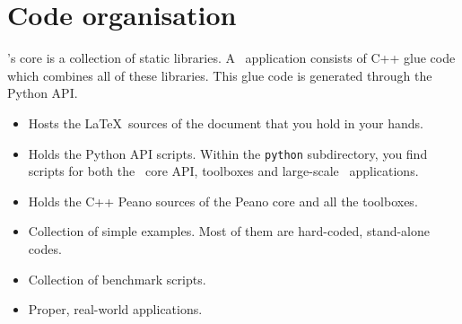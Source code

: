 \section*{Code organisation}

\Peano's core is a collection of static libraries. 
A \Peano\ application consists of C++ glue code which combines all of these
libraries.
This glue code is generated through the Python API.


\begin{itemize}
  \item[documentation] Hosts the \LaTeX\ sources of the document that you hold
  in your hands.
  \item[python] Holds the Python API scripts. Within the \texttt{python}
  subdirectory, you find scripts for both the \Peano\ core API, toolboxes and
  large-scale \Peano\ applications.
  \item[src] Holds the C++ Peano sources of the Peano core and all the
  toolboxes.
  \item[examples] Collection of simple examples. Most of them are hard-coded,
  stand-alone codes.
  \item[benchmarks] Collection of benchmark scripts.
  \item[applications] Proper, real-world applications.
\end{itemize}


